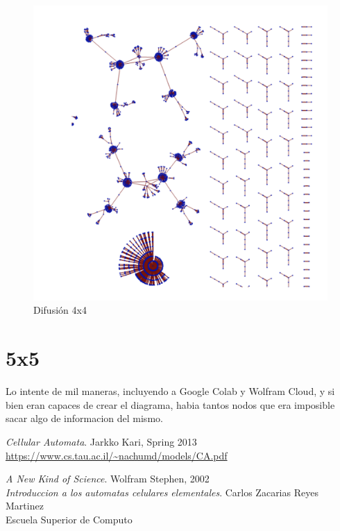\documentclass[12pt, fleqn]{report}                             %
\theoremstyle{break}                                            %
\begin{document}
        \begin{figure}[ht!]
          \centering
          \includegraphics[height=\textwidth]{dif4x42.png}
          \caption{Difusión 4x4}
        \end{figure}

       \section{5x5}

        Lo intente de mil maneras, incluyendo a Google Colab y Wolfram Cloud, y si bien eran capaces de crear
        el diagrama, habia tantos nodos que era imposible sacar algo de informacion del mismo.



\begin{thebibliography}{10}

      \textit{Cellular Automata}. 
      Jarkko Kari, Spring 2013 \\
      \url{https://www.cs.tau.ac.il/~nachumd/models/CA.pdf}

      \textit{A New Kind of Science}. 
      Wolfram Stephen, 2002 \\


\textit{Introduccion a los automatas celulares elementales}. 
Carlos Zacarias Reyes Martinez \\
Escuela Superior de Computo

\end{thebibliography}
\end{document}
